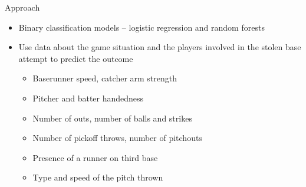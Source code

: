 \documentclass[10pt]{beamer}
\begin{document}
\begin{frame}{Approach}
\begin{itemize}
    \item Binary classification models -- logistic regression and random forests
    \vspace{3mm}
    \item Use data about the game situation and the players involved in the stolen base attempt to predict the outcome
    \begin{itemize}
        \item Baserunner speed, catcher arm strength

        \item Pitcher and batter handedness

        \item Number of outs, number of balls and strikes

        \item Number of pickoff throws, number of pitchouts

        \item Presence of a runner on third base

        \item Type and speed of the pitch thrown
    \end{itemize}
            
\end{itemize}
\end{frame}
\end{document}
